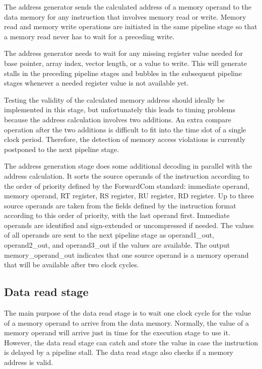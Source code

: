 \documentclass[11pt,a4paper,oneside,openright]{report}
\newcommand{\vv}{ \vspace{2mm} }   %
\begin{document}
The address generator sends the calculated address of a memory operand to the data memory for any instruction that involves memory read or write. Memory read and memory write operations are initiated in the same pipeline stage so that a memory read never has to wait for a preceding write.
\vv

The address generator needs to wait for any missing register value needed for base pointer, array index, vector length, or a value to write. This will generate stalls in the preceding pipeline stages and bubbles in the subsequent pipeline stages whenever a needed register value is not available yet.
\vv

Testing the validity of the calculated memory address should ideally be implemented in this stage, but unfortunately this leads to timing problems because the address calculation involves two additions. An extra compare operation after the two additions is difficult to fit into the time slot of a single clock period. Therefore, the detection of memory access violations is currently postponed to the next pipeline stage.
\vv

The address generation stage does some additional decoding in parallel with the address calculation. It sorts the source operands of the instruction according to the order of priority defined by the ForwardCom standard: 
immediate operand, memory operand, RT register, RS register, RU register, RD register. Up to three source operands are taken from the fields defined by the instruction format according to this order of priority, with the last operand first. Immediate operands are identified and sign-extended or uncompressed if needed. The values of all operands are sent to the next pipeline stage as operand1\_out, operand2\_out, and operand3\_out if the values are available. The output memory\_operand\_out indicates that one source operand is a memory operand that will be available after two clock cycles.
\vv

\subsection{Data read stage}
The main purpose of the data read stage is to wait one clock cycle for the value of a memory operand to arrive from the data memory. Normally, the value of a memory operand will arrive just in time for the execution stage to use it. However, the data read stage can catch and store the value in case the instruction is delayed by a pipeline stall. The data read stage also checks if a memory address is valid. 
\vv
\end{document}
